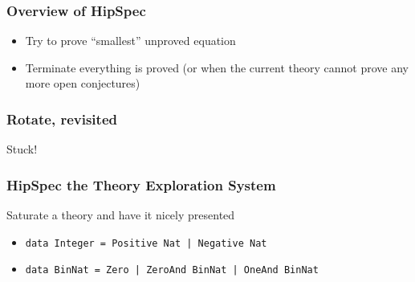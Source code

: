 \documentclass[serif,professionalfont]{beamer}
\newcommand\dn[0]{\vspace{\baselineskip}}
\newcommand\hs[1]{\texttt{#1}}
\begin{document}
\begin{frame}
  \frametitle{Overview of HipSpec}
  
  \pause
  \begin{itemize}
    \item Try to prove ``smallest'' unproved equation
    \item Terminate everything is proved (or when the current theory cannot prove any more open conjectures)
  \end{itemize}
\end{frame}


\begin{frame}
  \frametitle{Rotate, revisited}

    \rotateprop \rotatestep
    \begin{center}
      {\color{red} Stuck!}
    \end{center}

\end{frame}



\begin{frame}
  \frametitle{HipSpec the Theory Exploration System}


  \begin{center}
      Saturate a theory and have it nicely presented
  \end{center}

  \dn
  \pause


  \begin{itemize}
      \item \hs{data Integer = Positive Nat | Negative Nat}
      \item \hs{data BinNat  = Zero | ZeroAnd BinNat | OneAnd BinNat}
  \end{itemize}


\end{frame}
\end{document}
